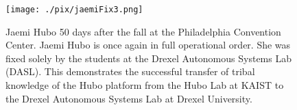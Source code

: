 \begin{figure}[thpb]
  \centering
\texttt{[image: ./pix/jaemiFix3.png]}
  \caption{Jaemi Hubo 50 days after the fall at the Philadelphia Convention Center.  
  Jaemi Hubo is once again in full operational order.  She was fixed solely by the students at 
  the Drexel Autonomous Systems Lab (DASL).  This demonstrates the successful transfer of tribal knowledge 
  of the Hubo platform from the Hubo Lab at KAIST to the Drexel Autonomous Systems Lab at Drexel University.
	}
  \label{fig:huboFix}
\end{figure}